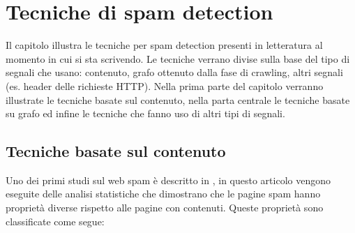 \chapter{Tecniche di spam detection}
Il capitolo illustra le tecniche per spam detection presenti in letteratura al momento in cui si sta scrivendo. Le tecniche verrano divise sulla base del tipo di segnali che usano: contenuto, grafo ottenuto dalla fase di crawling, altri segnali (es. header delle richieste HTTP). Nella prima parte del capitolo verranno illustrate le tecniche basate sul contenuto, nella parta centrale le tecniche basate su grafo ed infine le tecniche che fanno uso di altri tipi di segnali.

\section{Tecniche basate sul contenuto}
Uno dei primi studi sul web spam è descritto in \cite{Fetterly:2004:SDS:1017074.1017077}, in questo articolo vengono eseguite delle analisi statistiche che dimostrano che le  pagine spam  hanno proprietà diverse rispetto alle pagine con contenuti. Queste proprietà sono classificate come segue:
